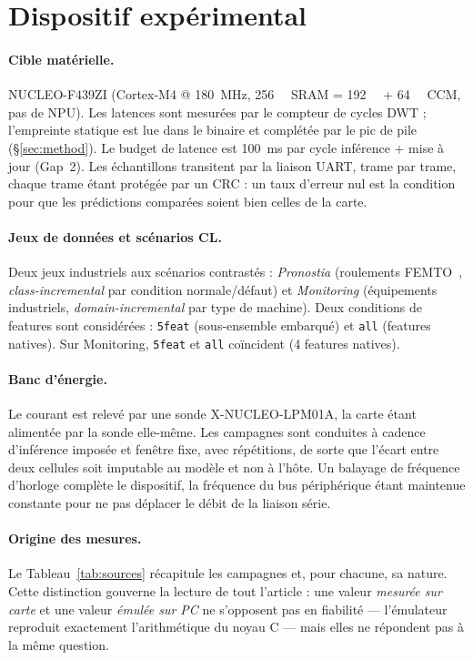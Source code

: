 \section{Dispositif expérimental}
\label{sec:setup}

\paragraph{Cible matérielle.} NUCLEO-F439ZI (Cortex-M4 @ \SI{180}{\mega\hertz}, \SI{256}{\kilo\byte} SRAM =
\SI{192}{\kilo\byte} + \SI{64}{\kilo\byte} \gls{CCM}, pas de NPU). Les latences sont mesurées par le compteur de
cycles DWT ; l'empreinte statique est lue dans le binaire et complétée par le pic de pile
(\S\ref{sec:method}). Le budget de latence est \SI{100}{\milli\second} par cycle inférence + mise à jour
(Gap~2). Les échantillons transitent par la liaison \gls{UART}, trame par trame, chaque trame étant protégée par
un CRC : un taux d'erreur nul est la condition pour que les prédictions comparées soient bien celles de la
carte.

\paragraph{Jeux de données et scénarios CL.} Deux jeux industriels aux scénarios contrastés :
\emph{Pronostia} (roulements FEMTO~\cite{Nectoux2012Pronostia}, \emph{class-incremental} par condition
normale/défaut) et \emph{Monitoring} (équipements industriels, \emph{domain-incremental} par type de
machine). Deux conditions de features sont considérées : \texttt{5feat} (sous-ensemble embarqué) et
\texttt{all} (features natives). Sur Monitoring, \texttt{5feat} et \texttt{all} coïncident (4 features
natives).

\paragraph{Banc d'énergie.} Le courant est relevé par une sonde X-NUCLEO-LPM01A, la carte étant alimentée
par la sonde elle-même. Les campagnes sont conduites à cadence d'inférence imposée et fenêtre fixe, avec
répétitions, de sorte que l'écart entre deux cellules soit imputable au modèle et non à l'hôte. Un
balayage de fréquence d'horloge complète le dispositif, la fréquence du bus périphérique étant maintenue
constante pour ne pas déplacer le débit de la liaison série.

\paragraph{Origine des mesures.} Le Tableau~\ref{tab:sources} récapitule les campagnes et, pour chacune,
sa nature. Cette distinction gouverne la lecture de tout l'article : une valeur \emph{mesurée sur carte}
et une valeur \emph{émulée sur PC} ne s'opposent pas en fiabilité --- l'émulateur reproduit exactement
l'arithmétique du noyau C --- mais elles ne répondent pas à la même question.

